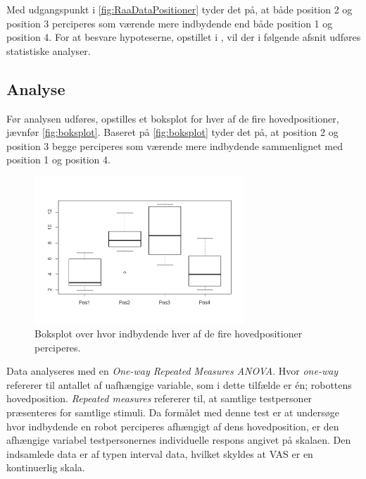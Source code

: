 %
Med udgangspunkt i \autoref{fig:RaaDataPositioner} tyder det på, at både position 2 og position 3 perciperes som værende mere indbydende end både position 1 og position 4.\blankline
%
For at besvare hypoteserne, opstillet i , vil der i følgende afsnit udføres statistiske analyser.   


 \subsection*{Analyse}
\label{Analyse}
%
Før analysen udføres, opstilles et boksplot for hver af de fire hovedpositioner, jævnfør \autoref{fig:boksplot}. Baseret på \autoref{fig:boksplot} tyder det på, at position 2 og position 3 begge perciperes som værende mere indbydende sammenlignet med position 1 og position 4.   
%
\begin{figure}[H]
\centering
\includegraphics[width = 0.7\textwidth]{Figure/Rplot.png} 
\caption{Boksplot over hvor indbydende hver af de fire hovedpositioner perciperes.}
\label{fig:boksplot}
\end{figure}
\noindent
%
Data analyseres med en \textit{One-way Repeated Measures ANOVA}. Hvor \textit{one-way} refererer til antallet af uafhængige variable, som i dette tilfælde er én; robottens hovedposition. \textit{Repeated measures} refererer til, at samtlige testpersoner præsenteres for samtlige stimuli. Da formålet med denne test er at undersøge hvor indbydende en robot perciperes afhængigt af dens hovedposition, er den afhængige variabel testpersonernes individuelle respons angivet på skalaen. Den indsamlede data er af typen interval data, hvilket skyldes at VAS er en kontinuerlig skala. 

